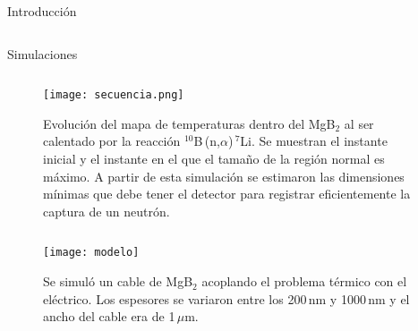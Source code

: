 \documentclass[final]{beamer}
\newlength{\onecolwid}
\begin{document}
\begin{frame}[t]
\begin{columns}[t]
\begin{column}{\onecolwid}
\begin{block}{\normalsize{Introducción}}
\begin{column}{19cm}
\end{column}
\end{block}
\vspace{1cm}
\begin{alertblock}{\normalsize{Simulaciones}}
\vspace*{1cm}
\begin{column}{37cm}
\vspace{-1.4cm}
\begin{figure}
\texttt{[image: secuencia.png]}
\caption{Evolución del mapa de temperaturas dentro del MgB$_2$ al ser calentado por la reacción $^{10}$B\,(n,$\alpha$)\,$^{7}$Li. Se muestran el instante inicial y el instante en el que el tamaño de la región normal es máximo. A partir de esta simulación se estimaron las dimensiones mínimas que debe tener el detector para registrar eficientemente la captura de un neutrón.}
\end{figure}
\end{column}

\begin{column}{37cm}
\begin{figure}
\centering
\texttt{[image: modelo]}
\caption{Se simuló un cable de MgB$_2$ acoplando el problema térmico con el eléctrico. Los espesores se variaron entre los 200\,nm y 1000\,nm y el ancho del cable era de 1\,$\mu$m.}
\end{figure}
\end{column}


\end{alertblock}
\end{column}
\end{columns}
\end{frame}
\end{document}
